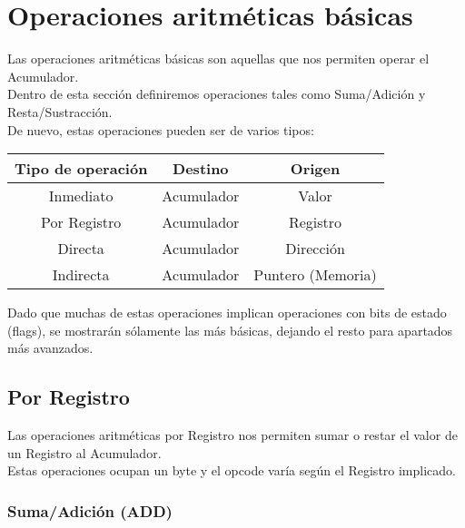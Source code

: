 \documentclass[12pt]{article}
\begin{document}
	\section{Operaciones aritméticas básicas}
	
		Las operaciones aritméticas básicas son aquellas que nos permiten operar el Acumulador.\\
		
		Dentro de esta sección definiremos operaciones tales como Suma/Adición y Resta/Sustracción.\\
		
		De nuevo, estas operaciones pueden ser de varios tipos:\\
		
		\begin{table}[H]
			\centering
			\begin{tabular}{c|cc}
				\toprule
				Tipo de operación & Destino & Origen     \\
				\midrule
				Inmediato & Acumulador & Valor             \\
				Por Registro & Acumulador & Registro       \\
				Directa & Acumulador & Dirección           \\
				Indirecta & Acumulador & Puntero (Memoria) \\			
				\bottomrule
			\end{tabular}
		
		\end{table}
	
		Dado que muchas de estas operaciones implican operaciones con bits de estado (flags), se mostrarán sólamente las más básicas, dejando el resto para apartados más avanzados.\\
		
		\subsection{Por Registro}
		
			Las operaciones aritméticas por Registro nos permiten sumar o restar el valor de un Registro al Acumulador.\\
		
			Estas operaciones ocupan un byte y el opcode varía según el Registro implicado.\\
		
			\subsubsection{Suma/Adición (ADD)}
			
\end{document}
